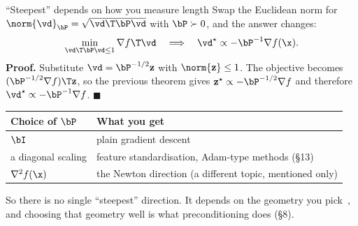 \begin{frame}{``Steepest'' depends on how you measure length}
  Swap the Euclidean norm for $\norm{\vd}_{\bP} = \sqrt{\vd\T\bP\vd}$ with $\bP\succ0$, and the answer changes:
  \[
    \min_{\vd\T\bP\vd\le1}\nabla f\T\vd
    \quad\Longrightarrow\quad
    \vd^\star \propto -\bP^{-1}\nabla f(\x).
  \]
  \small\textbf{Proof.} Substitute $\vd = \bP^{-1/2}\mathbf z$ with $\norm{\mathbf z}\le1$. The objective becomes
  $(\bP^{-1/2}\nabla f)\T\mathbf z$, so the previous theorem gives $\mathbf z^\star\propto-\bP^{-1/2}\nabla f$ and therefore
  $\vd^\star\propto-\bP^{-1}\nabla f$. $\blacksquare$

  \vspace{4pt}
  \begin{center}
  \begin{tabular}{@{}l l@{}}
    \toprule
    Choice of $\bP$ & What you get \\
    \midrule
    $\bI$ & plain gradient descent \\
    a diagonal scaling & feature standardisation, Adam-type methods (\S13) \\
    $\nabla^2 f(\x)$ & the Newton direction (a different topic, mentioned only) \\
    \bottomrule
  \end{tabular}
  \end{center}
  \footnotesize\textcolor{mGrey}{So there is no single ``steepest'' direction. It depends on the geometry you pick~\cite{boyd2004},
  and choosing that geometry well is what preconditioning does (\S8).}
\end{frame}
